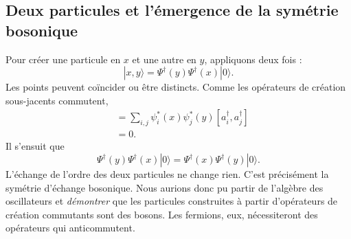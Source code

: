 \begin{classroomqa}
\end{classroomqa}

\subsection{Deux particules et l’émergence de la symétrie bosonique}

Pour créer une particule en \(x\) et une autre en \(y\), appliquons deux fois :
\begin{equation}
|x,y\rangle
=\Psi^\dagger(y)\Psi^\dagger(x)|0\rangle.
\label{eq:l06-two-particle-state}
\end{equation}
Les points peuvent coïncider ou être distincts. Comme les opérateurs de création sous-jacents commutent,
\begin{align}
[\Psi^\dagger(x),\Psi^\dagger(y)]
&=\sum_{i,j}\psi_i^*(x)\psi_j^*(y)
[a_i^\dagger,a_j^\dagger] \\
&=0.
\end{align}
Il s’ensuit que
\begin{equation}
\Psi^\dagger(y)\Psi^\dagger(x)|0\rangle
=\Psi^\dagger(x)\Psi^\dagger(y)|0\rangle.
\label{eq:l06-boson-exchange}
\end{equation}
L’échange de l’ordre des deux particules ne change rien. C’est précisément la symétrie d’échange bosonique. Nous aurions donc pu partir de l’algèbre des oscillateurs et \emph{démontrer} que les particules construites à partir d’opérateurs de création commutants sont des bosons. Les fermions, eux, nécessiteront des opérateurs qui anticommutent.

\begin{classroomqa}
\end{classroomqa}


